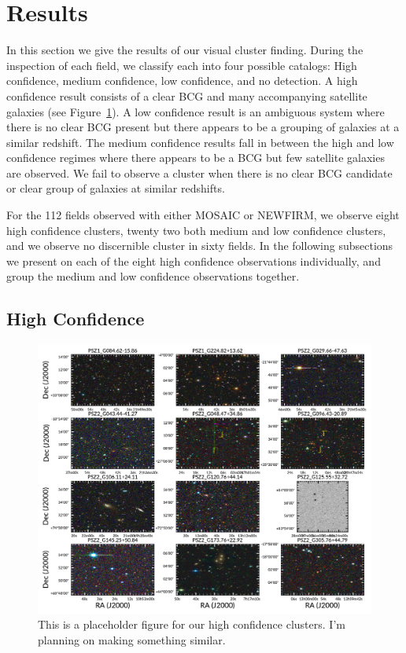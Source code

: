 \documentclass[apj, revtex4]{emulateapj}
\begin{document}
\section{Results}\label{sec:results}

In this section we give the results of our visual cluster finding. During the inspection of each field, we classify each into four possible catalogs: High confidence, medium confidence, low confidence, and no detection. A high confidence result consists of a clear BCG and many accompanying satellite galaxies (see Figure~\ref{fig:high confidence}). A low confidence result is an ambiguous system where there is no clear BCG present but there appears to be a grouping of galaxies at a similar redshift. The medium confidence results fall in between the high and low confidence regimes where there appears to be a BCG but few satellite galaxies are observed. We fail to observe a cluster when there is no clear BCG candidate or clear group of galaxies at similar redshifts.

For the 112 fields observed with either MOSAIC or NEWFIRM, we observe eight high confidence clusters, twenty two both medium and low confidence clusters, and we observe no discernible cluster in sixty fields. In the following subsections we present on each of the eight high confidence observations individually, and group the medium and low confidence observations together.

\subsection{High Confidence}

\begin{figure}
	\begin{center}
		\includegraphics[width=\textwidth]{./figures/result_mosaic.pdf}
	\end{center}
	\caption[Montage of remaining nine clusters]{This is a placeholder figure for our high confidence clusters. I'm planning on making something similar.}  
	\label{fig:high confidence} 
\end{figure}
\end{document}
